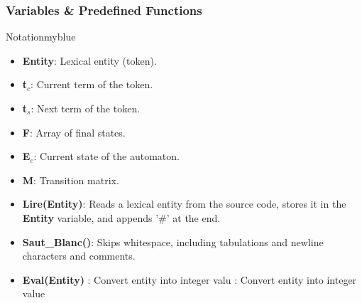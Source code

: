 \vspace{1cm}

\subsubsection{Variables \& Predefined Functions}
\begin{prettyBox}{Notation}{myblue}
\begin{itemize}
    \item \textbf{Entity}: Lexical entity (token).
    \item \textbf{t\(_c\)}: Current term of the token.
    \item \textbf{t\(_s\)}: Next term of the token.
    \item \textbf{F}: Array of final states.
    \item \textbf{E\(_c\)}: Current state of the automaton.
    \item \textbf{M}: Transition matrix.
    \item \textbf{Lire(Entity)}: Reads a lexical entity from the source code, stores it in the \textbf{Entity} 
    variable, and appends '\#' at the end.
    \item \textbf{Saut\_Blanc()}: Skips whitespace, including tabulations and newline characters and comments.
    \item \textbf{Eval(Entity)} : Convert entity into integer valu : Convert entity into integer value
\end{itemize}
\end{prettyBox}

\newpage

